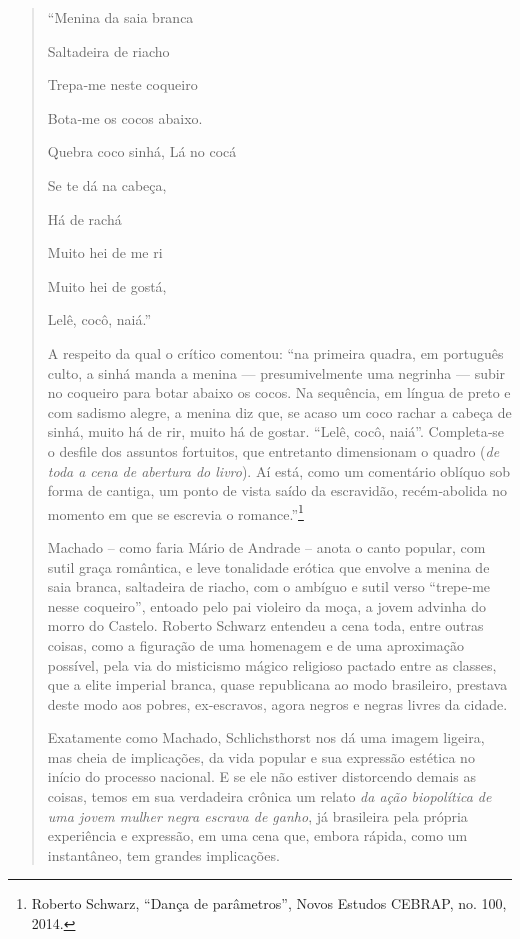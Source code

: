 \begin{quote}
``Menina da saia branca

Saltadeira de riacho

Trepa‑me neste coqueiro

Bota‑me os cocos abaixo.

Quebra coco sinhá, Lá no cocá

Se te dá na cabeça,

Há de rachá

Muito hei de me ri

Muito hei de gostá,

Lelê, cocô, naiá.''

A respeito da qual o crítico comentou: ``na primeira quadra, em
português culto, a sinhá manda a menina --- presumivelmente uma negrinha
--- subir no coqueiro para botar abaixo os cocos. Na sequência, em
língua de preto e com sadismo alegre, a menina diz que, se acaso um coco
rachar a cabeça de sinhá, muito há de rir, muito há de gostar. ``Lelê,
cocô, naiá''. Completa‑se o desfile dos assuntos fortuitos, que
entretanto dimensionam o quadro (\emph{de toda a cena de abertura do
livro}). Aí está, como um comentário oblíquo sob forma de cantiga, um
ponto de vista saído da escravidão, recém‑abolida no momento em que se
escrevia o romance.''\footnote{Roberto Schwarz, ``Dança de parâmetros'',
  Novos Estudos CEBRAP, no. 100, 2014.}

Machado -- como faria Mário de Andrade -- anota o canto popular, com
sutil graça romântica, e leve tonalidade erótica que envolve a menina de
saia branca, saltadeira de riacho, com o ambíguo e sutil verso
``trepe-me nesse coqueiro'', entoado pelo pai violeiro da moça, a jovem
advinha do morro do Castelo. Roberto Schwarz entendeu a cena toda, entre
outras coisas, como a figuração de uma homenagem e de uma aproximação
possível, pela via do misticismo mágico religioso pactado entre as
classes, que a elite imperial branca, quase republicana ao modo
brasileiro, prestava deste modo aos pobres, ex-escravos, agora negros e
negras livres da cidade.

Exatamente como Machado, Schlichsthorst nos dá uma imagem ligeira, mas
cheia de implicações, da vida popular e sua expressão estética no início
do processo nacional. E se ele não estiver distorcendo demais as coisas,
temos em sua verdadeira crônica um relato \emph{da ação biopolítica de
uma jovem mulher negra escrava de ganho}, já brasileira pela própria
experiência e expressão, em uma cena que, embora rápida, como um
instantâneo, tem grandes implicações.


\end{quote}

